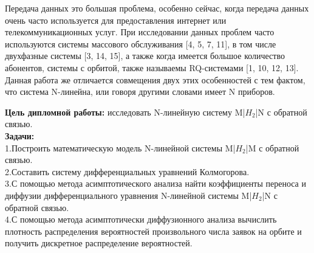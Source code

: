 
\hspace*{\parindent}%
Передача данных это большая проблема, особенно сейчас, когда передача данных очень часто используется для предоставления интернет или телекоммуникационных услуг. При исследовании данных проблем часто используются системы массового обслуживания [4, 5, 7, 11], в том числе двухфазные системы [3, 14, 15], а также когда имеется большое количество абонентов, системы с орбитой, также называемы RQ-системами [1, 10, 12, 13]. Данная работа же отличается совмещения двух этих особенностей с тем фактом, что система N-линейна, или говоря другими словами имеет N приборов. 

\textbf{Цель дипломной работы:} исследовать N-линейную систему M|$H_{2}$|N с обратной связью.\\

\textbf{Задачи:}\\
1.Построить математическую модель N-линейной системы M|$H_{2}$|M с обратной связью.\\
2.Составить систему дифференциальных уравнений Колмогорова.\\
3.С помощью метода асимптотического анализа найти коэффициенты переноса и диффузии дифференциального уравнения N-линейной системы M|$H_{2}$|N с обратной связью.\\
4.С помощью метода асимптотически диффузионного анализа вычислить плотность распределения вероятностей произвольного числа заявок на орбите и получить дискретное распределение вероятностей.

 
